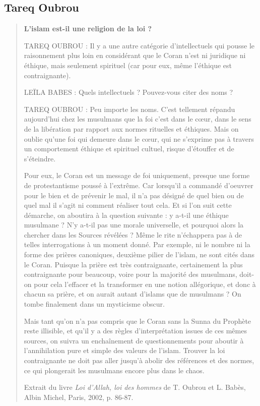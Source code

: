 \hypertarget{tareq-oubrou}{%
\subsection{\texorpdfstring{{Tareq
Oubrou}}{Tareq Oubrou}}\label{tareq-oubrou}}

\begin{quote}
\textbf{L'islam est-il une religion de la loi ?}

TAREQ OUBROU : Il y a une autre catégorie d'intellectuels qui pousse le
raisonnement plus loin en considérant que le Coran n'est ni juridique ni
éthique, mais seulement spirituel (car pour eux, même l'éthique est
contraignante).

LEÏLA BABES : Quels intellectuels ? Pouvez-vous citer des noms ?

TAREQ OUBROU : Peu importe les noms. C'est tellement répandu aujourd'hui
chez les musulmans que la foi c'est dans le cœur, dans le sens de la
libération par rapport aux normes rituelles et éthiques. Mais on oublie
qu'une foi qui demeure dans le cœur, qui ne s'exprime pas à travers un
comportement éthique et spirituel cultuel, risque d'étouffer et de
s'éteindre.

Pour eux, le Coran est un message de foi uniquement, presque une forme
de protestantisme poussé à l'extrême. Car lorsqu'il a commandé d'oeuvrer
pour le bien et de prévenir le mal, il n'a pas désigné de quel bien ou
de quel mal il s'agit ni comment réaliser tout cela. Et si l'on suit
cette démarche, on aboutira à la question suivante : y a-t-il une
éthique musulmane ? N'y a-t-il pas une morale universelle, et pourquoi
alors la chercher dans les Sources révélées ? Même le rite n'échappera
pas à de telles interrogations à un moment donné. Par exemple, ni le
nombre ni la forme des prières canoniques, deuxième pilier de l'islam,
ne sont cités dans le Coran. Puisque la prière est très contraignante,
certainement la plus contraignante pour beaucoup, voire pour la majorité
des musulmans, doit-on pour cela l'effacer et la transformer en une
notion allégorique, et donc à chacun sa prière, et on aurait autant
d'islams que de musulmans ? On tombe finalement dans un mysticisme
obscur.

Mais tant qu'on n'a pas compris que le Coran sans la Sunna du Prophète
reste illisible, et qu'il y a des règles d'interprétation issues de ces
mêmes sources, on suivra un enchaînement de questionnements pour aboutir
à l'annihilation pure et simple des valeurs de l'islam. Trouver la loi
contraignante ne doit pas aller jusqu'à abolir des références et des
normes, ce qui plongerait les musulmans encore plus dans le chaos.

Extrait du livre \emph{Loi d'Allah, loi des hommes} de T. Oubrou et L.
Babès, Albin Michel, Paris, 2002, p. 86-87.
\end{quote}

